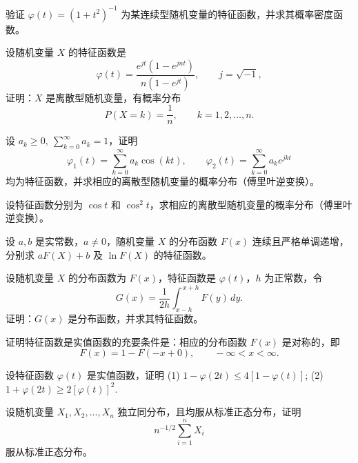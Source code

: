\begin{homework}[4.3]
验证 $\varphi(t)=(1+t^2)^{-1}$ 为某连续型随机变量的特征函数，并求其概率密度函数。
\end{homework}

\begin{homework}[4.4]
设随机变量 $X$ 的特征函数是
\[
\varphi(t)=\frac{e^{jt}(1-e^{jnt})}{n(1-e^{jt})},\qquad j=\sqrt{-1},
\]
证明：$X$ 是离散型随机变量，有概率分布
\[
P(X=k)=\frac{1}{n},\qquad k=1,2,\ldots,n.
\]
\end{homework}

\begin{homework}[4.5]
设 $a_k\ge 0,\ \sum_{k=0}^\infty a_k=1$，证明
\[
\varphi_1(t)=\sum_{k=0}^\infty a_k \cos(kt), 
\qquad 
\varphi_2(t)=\sum_{k=0}^\infty a_k e^{jkt}
\]
均为特征函数，并求相应的离散型随机变量的概率分布（傅里叶逆变换）。
\end{homework}

\begin{homework}[4.6]
设特征函数分别为 $\cos t$ 和 $\cos^2 t$，求相应的离散型随机变量的概率分布（傅里叶逆变换）。
\end{homework}
\begin{homework}[4.7]
设 $a,b$ 是实常数，$a\neq 0$，随机变量 $X$ 的分布函数 $F(x)$ 连续且严格单调递增，分别求 $aF(X)+b$ 及 $\ln F(X)$ 的特征函数。
\end{homework}

\begin{homework}[4.8]
设随机变量 $X$ 的分布函数为 $F(x)$，特征函数是 $\varphi(t)$，$h$ 为正常数，令
\[
G(x)=\frac{1}{2h}\int_{x-h}^{\,x+h}F(y)\,dy.
\]
证明：$G(x)$ 是分布函数，并求其特征函数。
\end{homework}

\begin{homework}[4.9]
证明特征函数是实值函数的充要条件是：相应的分布函数 $F(x)$ 是对称的，即  
\[
F(x)=1-F(-x+0), \qquad -\infty < x < \infty.
\]
\end{homework}

\begin{homework}[4.10]
设特征函数 $\varphi(t)$ 是实值函数，证明  
(1) \(\displaystyle 1-\varphi(2t)\le 4[1-\varphi(t)]\);  
(2) \(\displaystyle 1+\varphi(2t)\ge 2[\varphi(t)]^2\).
\end{homework}

\begin{homework}[4.11]
设随机变量 $X_1,X_2,\ldots,X_n$ 独立同分布，且均服从标准正态分布，证明  
\[
n^{-1/2}\sum_{i=1}^n X_i
\]
服从标准正态分布。
\end{homework}

